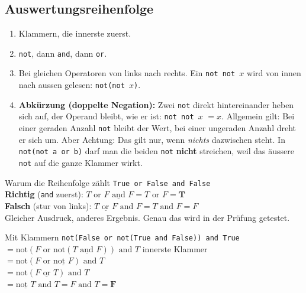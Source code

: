 \subsection*{Auswertungsreihenfolge}
\begin{enumerate}[nosep]
  \item Klammern, die innerste zuerst.
  \item \texttt{not}, dann \texttt{and}, dann \texttt{or}.
  \item Bei gleichen Operatoren von links nach rechts. Ein \texttt{not not $x$}
        wird von innen nach aussen gelesen: \texttt{not(not $x$)}.
  \item \textbf{Abkürzung (doppelte Negation):} Zwei \texttt{not} direkt hintereinander
        heben sich auf, der Operand bleibt, wie er ist: \texttt{not not $x$} $= x$.
        Allgemein gilt: Bei einer geraden Anzahl \texttt{not} bleibt der Wert, bei einer
        ungeraden Anzahl dreht er sich um.
        Aber Achtung: Das gilt nur, wenn \emph{nichts} dazwischen steht. In
        \texttt{not(not a or b)} darf man die beiden \texttt{not} \textbf{nicht} streichen,
        weil das äussere \texttt{not} auf die ganze Klammer wirkt.
\end{enumerate}

\begin{beispiel}{Warum die Reihenfolge zählt}
  \texttt{True or False and False}\\[2pt]
  \textbf{Richtig} (\texttt{and} zuerst): $T \text{ or } \underline{F \text{ and } F} = T \text{ or } F = \mathbf{T}$\\
  \textbf{Falsch} (stur von links): $\underline{T \text{ or } F} \text{ and } F = T \text{ and } F = F$\\[2pt]
  Gleicher Ausdruck, anderes Ergebnis. Genau das wird in der Prüfung getestet.
\end{beispiel}

\begin{beispiel}{Mit Klammern}
  \texttt{not(False or not(True and False)) and True}\\
  $= \text{not}(F \text{ or not}(\underline{T \text{ and } F})) \text{ and } T$ \hfill innerste Klammer\\
  $= \text{not}(F \text{ or } \underline{\text{not } F}) \text{ and } T$\\
  $= \text{not}(\underline{F \text{ or } T}) \text{ and } T$\\
  $= \underline{\text{not } T} \text{ and } T = F \text{ and } T = \mathbf{F}$
\end{beispiel}


